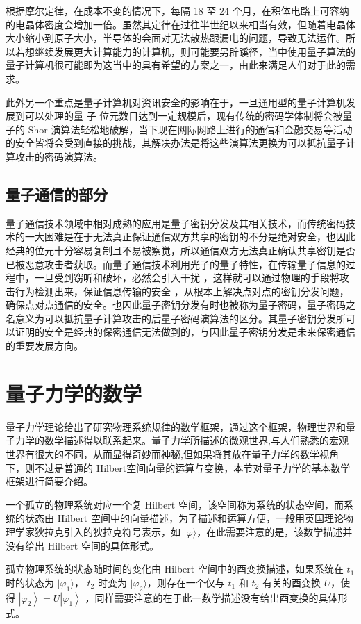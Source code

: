 根据摩尔定律，在成本不变的情况下，每隔 18 至 24 个月，在积体电路上可容纳的电晶体密度会增加一倍。虽然其定律在过往半世纪以来相当有效，但随着电晶体大小缩小到原子大小，半导体的会面对无法散热跟漏电的问题，导致无法运作。所以若想继续发展更大计算能力的计算机，则可能要另辟蹊径，当中使用量子算法的量子计算机很可能即为这当中的具有希望的方案之一，由此来满足人们对于此的需求。

此外另一个重点是量子计算机对资讯安全的影响在于，一旦通用型的量子计算机发展到可以处理的量 子 位元数目达到一定规模后，现有传统的密码学体制将会被量子的 Shor 演算法轻松地破解，当下现在网际网路上进行的通信和金融交易等活动的安全皆将会受到直接的挑战，其解决办法是将这些演算法更换为可以抵抗量子计算攻击的密码演算法。

\subsection{量子通信的部分}

量子通信技术领域中相对成熟的应用是量子密钥分发及其相关技术，而传统密码技术的一大困难是在于无法真正保证通信双方共享的密钥的不分是绝对安全，也因此经典的位元十分容易复制且不易被察觉，所以通信双方无法真正确认共享密钥是否已被恶意攻击者获取。而量子通信技术利用光子的量子特性，在传输量子信息的过程中，一旦受到窃听和破坏，必然会引入干扰 ，这样就可以通过物理的手段将攻击行为检测出来，保证信息传输的安全 ，从根本上解决点对点的密钥分发问题，确保点对点通信的安全。也因此量子密钥分发有时也被称为量子密码，量子密码之名意义为可以抵抗量子计算攻击的后量子密码演算法的区分。其量子密钥分发所可以证明的安全是经典的保密通信无法做到的，与因此量子密钥分发是未来保密通信的重要发展方向。

\section{量子力学的数学}

量子力学理论给出了研究物理系统规律的数学框架，通过这个框架，物理世界和量子力学的数学描述得以联系起来。量子力学所描述的微观世界,与人们熟悉的宏观世界有很大的不同，从而显得奇妙而神秘,但如果将其放在量子力学的数学视角下，则不过是普通的 Hilbert空间向量的运算与变换，本节对量子力学的基本数学框架进行简要介绍。

一个孤立的物理系统对应一个复 Hilbert 空间，该空间称为系统的状态空间，而系统的状态由 Hilbert 空间中的向量描述，为了描述和运算方便，一般用英国理论物理学家狄拉克引入的狄拉克符号表示，如 $|\varphi\rangle$，在此需要注意的是，该数学描述并没有给出 Hilbert 空间的具体形式。

孤立物理系统的状态随时间的变化由 Hilbert 空间中的酉变换描述，如果系统在 $t_{1}$ 时的状态为 $|\varphi_{1} \rangle$， $t_{2}$ 时变为 $|\varphi_{2} \rangle$，则存在一个仅与 $t_{1}$ 和 $t_{2}$ 有关的酉变换 $U$，使得 $\left|\varphi_{2}\right\rangle=U\left|\varphi_{1}\right\rangle$ ，同样需要注意的在于此一数学描述没有给出酉变换的具体形式。

